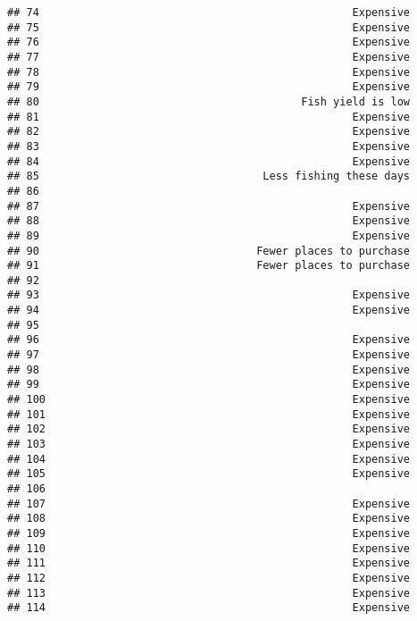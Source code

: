 \documentclass[
]{article}
\begin{document}
\begin{verbatim}
## 74                                                 Expensive
## 75                                                 Expensive
## 76                                                 Expensive
## 77                                                 Expensive
## 78                                                 Expensive
## 79                                                 Expensive
## 80                                         Fish yield is low
## 81                                                 Expensive
## 82                                                 Expensive
## 83                                                 Expensive
## 84                                                 Expensive
## 85                                   Less fishing these days
## 86                                                          
## 87                                                 Expensive
## 88                                                 Expensive
## 89                                                 Expensive
## 90                                  Fewer places to purchase
## 91                                  Fewer places to purchase
## 92                                                          
## 93                                                 Expensive
## 94                                                 Expensive
## 95                                                          
## 96                                                 Expensive
## 97                                                 Expensive
## 98                                                 Expensive
## 99                                                 Expensive
## 100                                                Expensive
## 101                                                Expensive
## 102                                                Expensive
## 103                                                Expensive
## 104                                                Expensive
## 105                                                Expensive
## 106                                                         
## 107                                                Expensive
## 108                                                Expensive
## 109                                                Expensive
## 110                                                Expensive
## 111                                                Expensive
## 112                                                Expensive
## 113                                                Expensive
## 114                                                Expensive

\end{verbatim}
\end{document}
